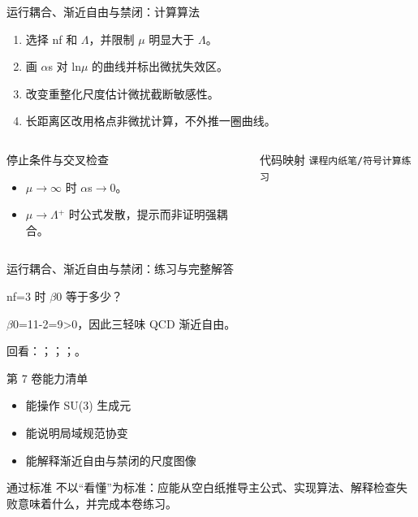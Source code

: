 \begin{frame}[t]{运行耦合、渐近自由与禁闭：计算算法}
\footnotesize
{}\begin{enumerate}
\item 选择 nf 和 \ensuremath{\Lambda}，并限制 \ensuremath{\mu} 明显大于 \ensuremath{\Lambda}。
\item 画 \ensuremath{\alpha}s 对 ln\ensuremath{\mu} 的曲线并标出微扰失效区。
\item 改变重整化尺度估计微扰截断敏感性。
\item 长距离区改用格点非微扰计算，不外推一圈曲线。
\end{enumerate}\begin{columns}[T,onlytextwidth]
\begin{block}{停止条件与交叉检查}\scriptsize\begin{itemize}
\item[\CheckMark] \ensuremath{\mu}\ensuremath{\rightarrow}\ensuremath{\infty} 时 \ensuremath{\alpha}s\ensuremath{\rightarrow}0。
\item[\CheckMark] \ensuremath{\mu}\ensuremath{\rightarrow}\ensuremath{\Lambda}\ensuremath{^{+}} 时公式发散，提示而非证明强耦合。
\end{itemize}\end{block}
\begin{block}{代码映射}
\scriptsize \texttt{课程内纸笔/\allowbreak{}符号计算练习}
\end{block}\end{columns}\end{frame}

\begin{frame}[t]{运行耦合、渐近自由与禁闭：练习与完整解答}
\footnotesize
\begin{block}{}nf=3 时 \ensuremath{\beta}0 等于多少？\end{block}
\begin{exampleblock}{}\ensuremath{\beta}0=11-2=9>0，因此三轻味 QCD 渐近自由。\end{exampleblock}
\vfill
\scriptsize 回看：；；；。
\end{frame}

\begin{frame}[t]{第 7 卷能力清单}
\small\begin{itemize}
\item[\CheckMark] 能操作 SU(3) 生成元
\item[\CheckMark] 能说明局域规范协变
\item[\CheckMark] 能解释渐近自由与禁闭的尺度图像
\end{itemize}\vfill\begin{block}{通过标准}
不以“看懂”为标准：应能从空白纸推导主公式、实现算法、解释检查失败意味着什么，并完成本卷练习。
\end{block}\end{frame}

